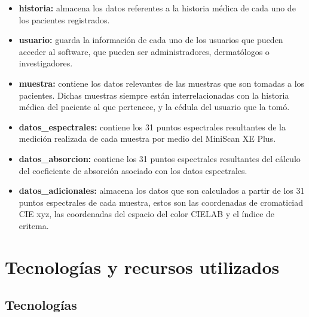 		\begin{itemize}
				
				\item \textbf{historia:} almacena los datos referentes a la historia m\'{e}dica de cada uno de los pacientes registrados.
				
				\item \textbf{usuario:} guarda la informaci\'{o}n de cada uno de los usuarios que pueden acceder al software, que pueden ser administradores, dermat\'{o}logos o investigadores.
				
				\item \textbf{muestra:} contiene los datos relevantes de las muestras que son tomadas a los pacientes. Dichas muestras siempre est\'{a}n interrelacionadas con la historia m\'{e}dica del paciente al que pertenece, y la c\'{e}dula del usuario que la tom\'{o}.

				\item \textbf{datos\_espectrales:} contiene los 31 puntos espectrales resultantes de la medici\'{o}n realizada de cada muestra por medio del MiniScan XE Plus.
				
				\item \textbf{datos\_absorcion:} contiene los 31 puntos espectrales resultantes del c\'{a}lculo del coeficiente de absorci\'{o}n asociado con los datos espectrales.
				
				\item \textbf{datos\_adicionales:} almacena los datos que son calculados a partir de los 31 puntos espectrales de cada muestra, estos son las coordenadas de cromaticiad CIE xyz, las coordenadas del espacio del color CIELAB y el \'{i}ndice de eritema.
				
		\end{itemize}

\section{Tecnolog\'{i}as y recursos utilizados}

	\subsection{Tecnolog\'{i}as}
	
